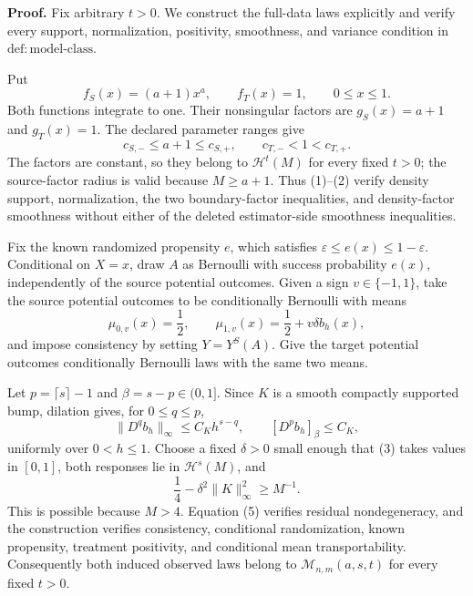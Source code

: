 \textbf{Proof.}
Fix arbitrary \(t>0\). We construct the full-data laws explicitly and verify every support, normalization, positivity, smoothness, and variance condition in \(\mathrm{def:model\text{-}class}\).

Put
\[
f_S(x)=(a+1)x^a,
\qquad
f_T(x)=1,
\qquad 0\le x\le1.
\tag{1}
\]
Both functions integrate to one. Their nonsingular factors are \(g_S(x)=a+1\) and \(g_T(x)=1\). The declared parameter ranges give
\[
c_{S,-}\le a+1\le c_{S,+},
\qquad
c_{T,-}<1<c_{T,+}.
\tag{2}
\]
The factors are constant, so they belong to \(\mathcal H^t(M)\) for every fixed \(t>0\); the source-factor radius is valid because \(M\ge a+1\). Thus (1)--(2) verify density support, normalization, the two boundary-factor inequalities, and density-factor smoothness without either of the deleted estimator-side smoothness inequalities.

Fix the known randomized propensity \(e\), which satisfies \(\varepsilon\le e(x)\le1-\varepsilon\). Conditional on \(X=x\), draw \(A\) as Bernoulli with success probability \(e(x)\), independently of the source potential outcomes. Given a sign \(v\in\{-1,1\}\), take the source potential outcomes to be conditionally Bernoulli with means
\[
\mu_{0,v}(x)=\frac12,
\qquad
\mu_{1,v}(x)=\frac12+v\delta b_h(x),
\tag{3}
\]
and impose consistency by setting \(Y=Y^S(A)\). Give the target potential outcomes conditionally Bernoulli laws with the same two means.

Let \(p=\lceil s\rceil-1\) and \(\beta=s-p\in(0,1]\). Since \(K\) is a smooth compactly supported bump, dilation gives, for \(0\le q\le p\),
\[
\lVert D^q b_h\rVert_\infty\le C_Kh^{s-q},
\qquad
[D^p b_h]_{\beta}\le C_K,
\tag{4}
\]
uniformly over \(0<h\le1\). Choose a fixed \(\delta>0\) small enough that (3) takes values in \([0,1]\), both responses lie in \(\mathcal H^s(M)\), and
\[
\frac14-\delta^2\lVert K\rVert_\infty^2\ge M^{-1}.
\tag{5}
\]
This is possible because \(M>4\). Equation (5) verifies residual nondegeneracy, and the construction verifies consistency, conditional randomization, known propensity, treatment positivity, and conditional mean transportability. Consequently both induced observed laws belong to \(\mathcal M_{n,m}(a,s,t)\) for every fixed \(t>0\).


